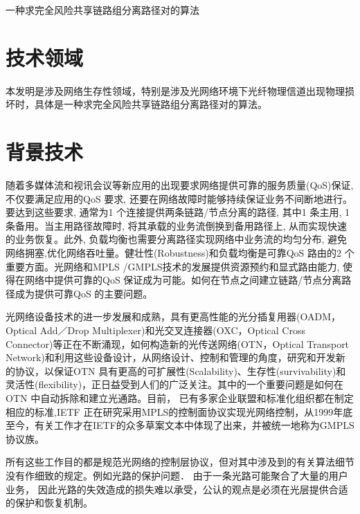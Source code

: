 ﻿
\newpage
\thispagestyle{fancy}
\fancyhf{} %
\setcounter{page}{1}
\fancyfoot[C]{\bfseries\thepage}
\fancyhead[CO]{\bfseries\rightmark}
\fancyhead[RE]{\bfseries\leftmark}
\renewcommand{\headrulewidth}{0.4pt}
\renewcommand{\footrulewidth}{0pt}
\begin{center}
  一种求完全风险共享链路组分离路径对的算法
\end{center}
\section*{技术领域}
本发明是涉及网络生存性领域，特别是涉及光网络环境下光纤物理信道出现物理损坏时，具体是一种求完全风险共享链路组分离路径对的算法。
\section*{背景技术}
随着多媒体流和视讯会议等新应用的出现要求网络提供可靠的服务质量(QoS)保证, 不仅要满足应用的QoS 要求, 还要在网络故障时能够持续保证业务不间断地进行。要达到这些要求, 通常为1 个连接提供两条链路/节点分离的路径, 其中1 条主用, 1 条备用。当主用路径故障时, 将其承载的业务流倒换到备用路径上, 从而实现快速的业务恢复。此外, 负载均衡也需要分离路径实现网络中业务流的均匀分布, 避免网络拥塞,优化网络吞吐量。健壮性(Robustness)和负载均衡是可靠QoS 路由的2 个重要方面。光网络和MPLS /GMPLS技术的发展提供资源预约和显式路由能力, 使得在网络中提供可靠的QoS 保证成为可能。如何在节点之间建立链路/节点分离路径成为提供可靠QoS 的主要问题。

光网络设备技术的进一步发展和成熟，具有更高性能的光分插复用器(OADM，Optical Add／Drop Multiplexer)和光交叉连接器(OXC，Optical Cross Connector)等正在不断涌现，如何构造新的光传送网络(OTN，Optical Transport Network)和利用这些设备设计，从网络设计、控制和管理的角度，研究和开发新的协议，以保证OTN 具有更高的可扩展性(Scalability)、生存性(survivability)和灵活性(flexibility)，正日益受到人们的广泛关注。其中的一个重要问题是如何在OTN 中自动拆除和建立光通路。目前， 已有多家企业联盟和标准化组织都在制定相应的标准,IETF 正在研究采用MPLS的控制面协议实现光网络控制，从1999年底至今，有关工作才在IETF的众多草案文本中体现了出来，并被统一地称为GMPLS协议族。

所有这些工作目的都是规范光网络的控制层协议，但对其中涉及到的有关算法细节没有作细致的规定。例如光路的保护问题． 由于一条光路可能聚合了大量的用户业务， 因此光路的失效造成的损失难以承受，公认的观点是必须在光层提供合适的保护和恢复机制。

